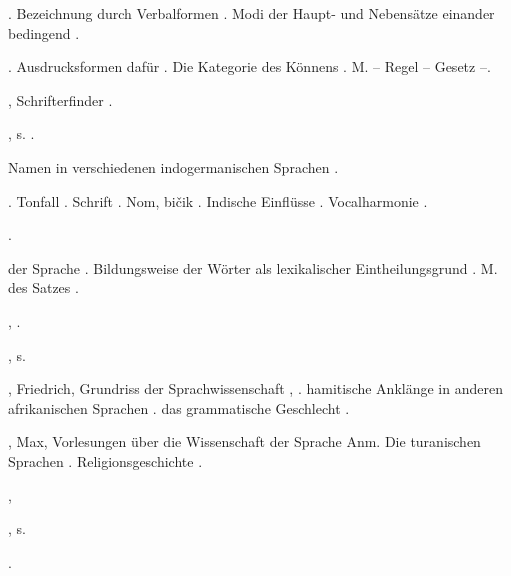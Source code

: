 \begin{register}
. Bezeichnung durch Verbalformen \pageref{sp.383}. Modi der Haupt- und Nebensätze einander bedingend \pageref{sp.465}.

. Ausdrucksformen dafür \pageref{sp.95}. Die Kategorie des Könnens \pageref{sp.103}. M. – Regel – Gesetz \pageref{sp.385}–\pageref{sp.387}.

, Schrifterfinder \pageref{sp.131}.

, s. . 

 Namen in verschiedenen indogermanischen Sprachen \pageref{sp.154}.

. Tonfall \pageref{sp.34}. Schrift \pageref{sp.131}. Nom, bičik \pageref{sp.264}. Indische Einflüsse \pageref{sp.271}. Vocalharmonie \pageref{sp.402}.

 \pageref{sp.306}.

 der Sprache \pageref{sp.17}. Bildungsweise der Wörter als lexikalischer Eintheilungsgrund \pageref{sp.123}. M. des Satzes \pageref{sp.149}.



 \pageref{sp.36}, \pageref{sp.182}.

, s. 



, Friedrich, Grundriss der Sprachwissenschaft \pageref{sp.28}, \pageref{sp.51}.  hamitische Anklänge in anderen afrikanischen Sprachen \pageref{sp.161}.   das grammatische Geschlecht \pageref{sp.481}.

, Max, Vorlesungen über die Wissenschaft der Sprache \pageref{sp.52} Anm. Die turanischen Sprachen \pageref{sp.155}. Religionsgeschichte \pageref{sp.294}. 

,  

, s. 

 \pageref{sp.107}.


\end{register}
